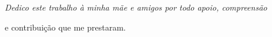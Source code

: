 \null
\vfill

{\normalsize \it \hfill Dedico este trabalho à minha mãe e amigos por todo apoio, compreensão \vspace*{4pt}

\hfill e contribuição que me prestaram.}
